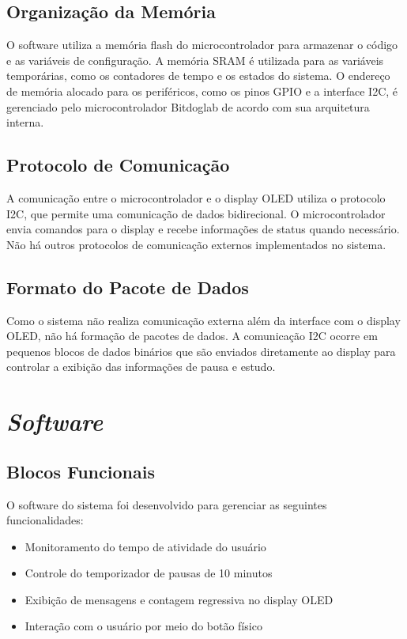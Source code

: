 \documentclass{article}
\begin{document}
\subsection{Organização da Memória}
O software utiliza a memória flash do microcontrolador para armazenar o código e as variáveis de configuração. A memória SRAM é utilizada para as variáveis temporárias, como os contadores de tempo e os estados do sistema. O endereço de memória alocado para os periféricos, como os pinos GPIO e a interface I2C, é gerenciado pelo microcontrolador Bitdoglab de acordo com sua arquitetura interna.

\subsection{Protocolo de Comunicação}
A comunicação entre o microcontrolador e o display OLED utiliza o protocolo I2C, que permite uma comunicação de dados bidirecional. O microcontrolador envia comandos para o display e recebe informações de status quando necessário. Não há outros protocolos de comunicação externos implementados no sistema.

\subsection{Formato do Pacote de Dados}
Como o sistema não realiza comunicação externa além da interface com o display OLED, não há formação de pacotes de dados. A comunicação I2C ocorre em pequenos blocos de dados binários que são enviados diretamente ao display para controlar a exibição das informações de pausa e estudo.

\section{\textit{Software}}

\subsection{Blocos Funcionais}
O software do sistema foi desenvolvido para gerenciar as seguintes funcionalidades:
\begin{itemize}
    \item Monitoramento do tempo de atividade do usuário
    \item Controle do temporizador de pausas de 10 minutos
    \item Exibição de mensagens e contagem regressiva no display OLED
    \item Interação com o usuário por meio do botão físico
\end{itemize}
\end{document}
